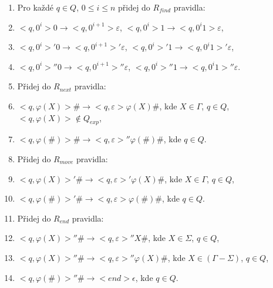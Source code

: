 \begin{Alg}
\begin{list}{}{\setlength\parsep{0cm} \setlength\itemsep{0cm} \setlength\leftmargin{1em}}
\begin{enumerate}

  \item Pro každé $q \in Q$, $0 \le i \le n$ přidej do $R_{find}$ pravidla:

\renewcommand{\labelenumi}{(\roman{enumi})}

  \item $<q, 0^i> 0 \rightarrow <q, 0^{i+1}> \varepsilon $, $<q, 0^i> 1 \rightarrow <q, 0^i 1> \varepsilon $,
  \item $<q, 0^i>' 0 \rightarrow <q, 0^{i+1}>' \varepsilon $, $<q, 0^i>' 1 \rightarrow <q, 0^i 1>' \varepsilon $,
  \item $<q, 0^i>'' 0 \rightarrow <q, 0^{i+1}>'' \varepsilon $, $<q, 0^i>'' 1 \rightarrow <q, 0^i 1>'' \varepsilon $.



  \item Přidej do $R_{next}$ pravidla:

\renewcommand{\labelenumi}{(\roman{enumi})}

  \item $<q, \varphi(X)> \# \rightarrow <q, \varepsilon> \varphi(X) \# $, kde $X \in \Gamma$, $q \in Q$, $<q, \varphi(X)> \notin Q_{exp}$,
  \item $<q, \varphi(\#) > \# \rightarrow <q, \varepsilon>'' \varphi(\#) \# $, kde $q \in Q$.


  \item Přidej do $R_{move}$ pravidla:

\renewcommand{\labelenumi}{(\roman{enumi})}

  \item $<q, \varphi(X)>' \# \rightarrow <q, \varepsilon>' \varphi(X) \# $, kde $X \in \Gamma$, $q \in Q$,
  \item $<q, \varphi(\#) >' \# \rightarrow <q, \varepsilon> \varphi(\#) \# $, kde $q \in Q$.


  \item Přidej do $R_{end}$ pravidla:

\renewcommand{\labelenumi}{(\roman{enumi})}

  \item $<q, \varphi(X) >'' \# \rightarrow <q, \varepsilon>'' X \# $, kde $X \in \Sigma$, $q \in Q$,
  \item $<q, \varphi(X) >'' \# \rightarrow <q, \varepsilon>'' \varphi(X) \# $, kde $X \in (\Gamma - \Sigma)$, $q \in Q$,
  \item $<q, \varphi(\#) >'' \# \rightarrow <end> \epsilon $, kde $q \in Q$.

\end{enumerate}

\end{list}
\end{Alg}

